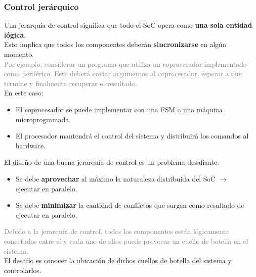 \documentclass[aspectratio=169]{beamer}
\begin{document}
\begin{frame}[t,fragile]
    \frametitle{Control jerárquico}
    \small
    Una jerarquía de control significa que todo el SoC opera como \textcolor{naranjauca}{\textbf{una sola entidad lógica}.}\\
    \textcolor{verdeuca}{Esto implica que todos los componentes deberán \textbf{sincronizarse} en algún momento.}\\
    \pause
    \vspace{0.2cm}
    \textcolor{gray}{
    Por ejemplo, considerar un programa que utiliza un coprocesador implementado como periférico. Este deberá enviar argumentos al coprocesador, esperar a que termine y finalmente recuperar el resultado.}\\
    \pause
    \vspace{0.2cm}
    En este caso:
    \begin{itemize}
    \setlength\itemsep{0cm}
    \item El coprocesador se puede implementar con una FSM o una máquina microprogramada.
    \item El procesador mantendrá el control del sistema y distribuirá los comandos al hardware.
    \end{itemize}
    \pause
    \vspace{0.2cm}
    \textcolor{verdeuca}{El diseño de una buena jerarquía de control es un problema desafiante.}\\
    \begin{itemize}
     \item Se debe \textbf{aprovechar} al máximo la naturaleza distribuida del SoC $\rightarrow$ ejecutar en paralelo.
     \item Se debe \textbf{minimizar} la cantidad de conflictos que surgen como resultado de ejecutar en paralelo.
    \end{itemize}
    \pause
    \textcolor{gray}{Debido a la jerarquía de control, todos los componentes están lógicamente conectados entre sí y cada uno de ellos puede provocar un cuello de botella en el sistema.}\\
    El desafío es conocer la ubicación de dichos cuellos de botella del sistema y controlarlos.
\end{frame}
\end{document}
